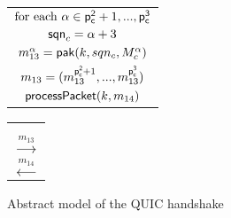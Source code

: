 \begin{figure*}[!htp]
\begin{center}
\begin{enumerate}
{\begin{minipage}[t]{0.38\textwidth}
  \centering
   \begin{tabular}{c}
    $\text{for each } \alpha \in {\ensuremath{\mathsf{p_c^{2}}}+1,...,\ensuremath{\mathsf{p_c^{3}}}}$ \\
    $\mathsf{sqn}_c = \alpha + 3$ \\
    $m_{13}^{\alpha} = \mathsf{pak}(k, sqn_c, M_c^{\alpha})$ \\
    $m_{13} = (m_{13}^{\mathsf{p_c^{2}}+1},...,m_{13}^{\mathsf{p_c^{3}}})$ \\
    $\mathsf{processPacket}(k, m_{14})$ \\
   \end{tabular}
  \end{minipage}%
 }
 \begin{minipage}[t]{0.13\textwidth}
  \centering
  \begin{tabular}{c}
   $ $ \\
   $ $ \\
   $\xrightarrow{m_{13}}$ \\
   $\xleftarrow{m_{14}}$ \\
  \end{tabular}
 \end{minipage}%
\end{enumerate}
 \caption{Abstract model of the QUIC handshake}\label{fig:quic_abst}
 \end{center}
\end{figure*}